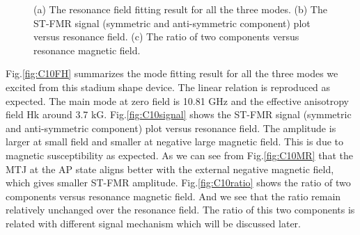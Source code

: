 \begin{figure}[!ht]
\centering
{}
\caption{(a) The resonance field fitting result for all the three modes. (b) The ST-FMR signal (symmetric and anti-symmetric component) plot versus resonance field. (c) The ratio of two components versus resonance magnetic field. }
\end{figure}

Fig.\ref{fig:C10FH} summarizes the mode fitting result for all the three modes we excited from this stadium shape device. The linear relation is reproduced as expected. The main mode at zero field is 10.81 GHz and the effective anisotropy field Hk around 3.7 kG. Fig.\ref{fig:C10signal} shows the ST-FMR signal (symmetric and anti-symmetric component) plot versus resonance field. The amplitude is larger at small field and smaller at negative large magnetic field. This is due to magnetic susceptibility as expected. As we can see from Fig.\ref{fig:C10MR} that the MTJ at the AP state aligns better with the external negative magnetic field, which gives smaller ST-FMR amplitude. Fig.\ref{fig:C10ratio} shows the ratio of two components versus resonance magnetic field. And we see that the ratio remain relatively unchanged over the resonance field. The ratio of this two components is related with different signal mechanism which will be discussed later.


